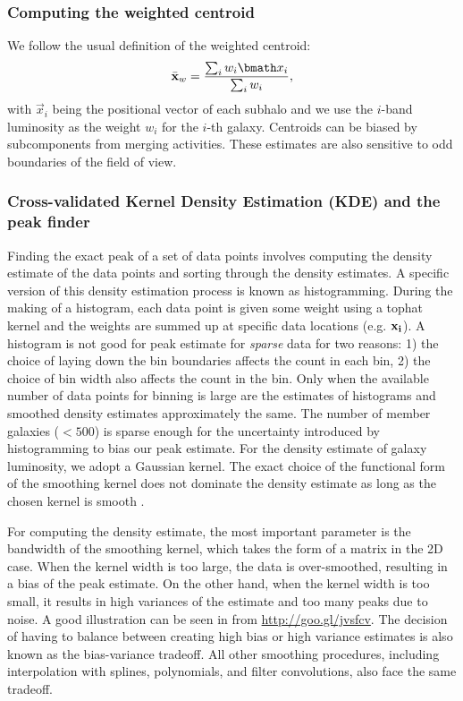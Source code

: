 \subsubsection{Computing the weighted centroid}
\label{subsubsec:weighted_centroid}
We follow the usual definition of the weighted centroid: 
\begin{equation}
	\bar{\bf x}_w = \frac{\sum_i w_i \vec{x}_i}{\sum_i w_i},
\end{equation}
with $\vec{x}_i$ being the positional vector of each subhalo 
and we use the $i$-band luminosity 
as the weight $w_i$ for the $i$-th galaxy.
Centroids can be biased by subcomponents from merging activities. 
These estimates are also sensitive to odd boundaries 
of the field of view.

\subsubsection{Cross-validated Kernel Density Estimation (KDE) and the peak finder} 
\label{subsubsec:KDE}
Finding the exact peak of a set of data points 
involves computing the density estimate of the data points and sorting through
the density estimates. A specific version of this density estimation process is
known as histogramming. During the making of a histogram, each data point is
given some weight using a tophat kernel and the weights are summed up at
specific data locations (e.g. $\bf{x}_i$). 
A histogram is not good for peak estimate for {\it sparse} data for two reasons: 1) the
choice of laying down the bin boundaries affects the count in each bin, 2) the choice of
bin width also affects the count in the bin. Only when the available number of data points
for binning is large are the estimates of histograms and smoothed density
estimates approximately the same. The number of member galaxies ($< 500$) 
is sparse enough for the uncertainty introduced by histogramming to bias our
peak estimate. For the density estimate of galaxy luminosity, 
we adopt a Gaussian kernel. 
The exact choice of the functional form of the smoothing kernel does
not dominate the density estimate as long as the chosen kernel is
smooth \citep{Feigelson2014}. 

For computing the density estimate, the most important parameter  
is the bandwidth of the smoothing kernel, 
which takes the form of a matrix in the 2D case. 
When the kernel width is
too large, the data is over-smoothed, 
resulting in a bias of the peak estimate. On the other hand, when the kernel
width is too small, it results in high variances of the estimate and 
too many peaks due to noise. 
A good illustration can be seen in \citealt{Vanderplas2012} from 
\href{http://www.astroml.org/book\_figures/chapter6/fig\_hist\_to\_kernel.html}{http://goo.gl/jvsfcv}.
The decision of having to balance between creating high
bias or high variance estimates is also known as the bias-variance tradeoff. 
All other smoothing procedures, including interpolation with splines,
polynomials, and filter convolutions, also face the same tradeoff. 


